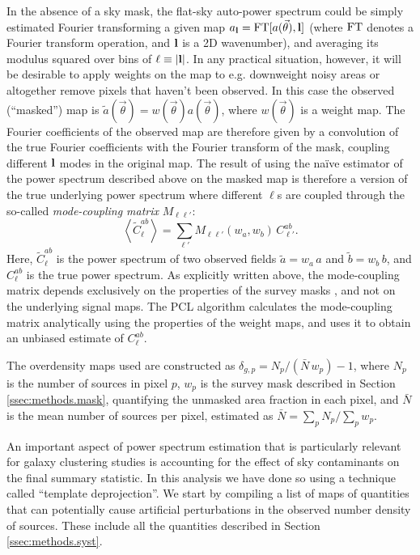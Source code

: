 \documentclass[a4paper,11pt]{article}
\newcommand{\nv}{\vec{\theta}}
\begin{document}
    In the absence of a sky mask, the flat-sky auto-power spectrum could be simply estimated Fourier transforming a given map $a_{\bf l}={\rm FT}[a(\nv),{\bf l}]$ (where ${\rm FT}$ denotes a Fourier transform operation, and ${\bf l}$ is a 2D wavenumber), and averaging its modulus squared over bins of $\ell\equiv|{\bf l}|$. In any practical situation, however, it will be desirable to apply weights on the map to e.g. downweight noisy areas or altogether remove pixels that haven't been observed. In this case the observed (``masked'') map is $\tilde{a}(\nv)=w(\nv)a(\nv)$, where $w(\nv)$ is a weight map. The Fourier coefficients of the observed map are therefore given by a convolution of the true Fourier coefficients with the Fourier transform of the mask, coupling different ${\bf l}$ modes in the original map. The result of using the na\"ive estimator of the power spectrum described above on the masked map is therefore a version of the true underlying power spectrum where different $\ell$s are coupled through the so-called {\sl mode-coupling matrix} $M_{\ell\ell'}$:
    \begin{equation}
      \left\langle \tilde{C}^{ab}_\ell \right\rangle = \sum_{\ell'} M_{\ell\ell'}(w_a,w_b)\,C^{ab}_{\ell'}.
    \end{equation}
    Here, $\tilde{C}^{ab}_\ell$ is the power spectrum of two observed fields $\tilde{a}=w_a\,a$ and $\tilde{b}=w_b\,b$, and $C^{ab}_\ell$ is the true power spectrum. As explicitly written above, the mode-coupling matrix depends exclusively on the properties of the survey masks \citep{2002ApJ...567....2H}, and not on the underlying signal maps. The PCL algorithm calculates the mode-coupling matrix analytically using the properties of the weight maps, and uses it to obtain an unbiased estimate of $C^{ab}_\ell$.
    
    The overdensity maps used are constructed as $\delta_{g,p}=N_p/(\bar{N}\,w_p)-1$, where $N_p$ is the number of sources in pixel $p$, $w_p$ is the survey mask described in Section \ref{ssec:methods.mask}, quantifying the unmasked area fraction in each pixel, and $\bar{N}$ is the mean number of sources per pixel, estimated as $\bar{N}=\sum_p N_p/\sum_p w_p$.
    
    An important aspect of power spectrum estimation that is particularly relevant for galaxy clustering studies is accounting for the effect of sky contaminants on the final summary statistic. In this analysis we have done so using a technique called ``template deprojection''. We start by compiling a list of maps of quantities that can potentially cause artificial perturbations in the observed number density of sources. These include all the quantities described in Section \ref{ssec:methods.syst}.
    
\end{document}
